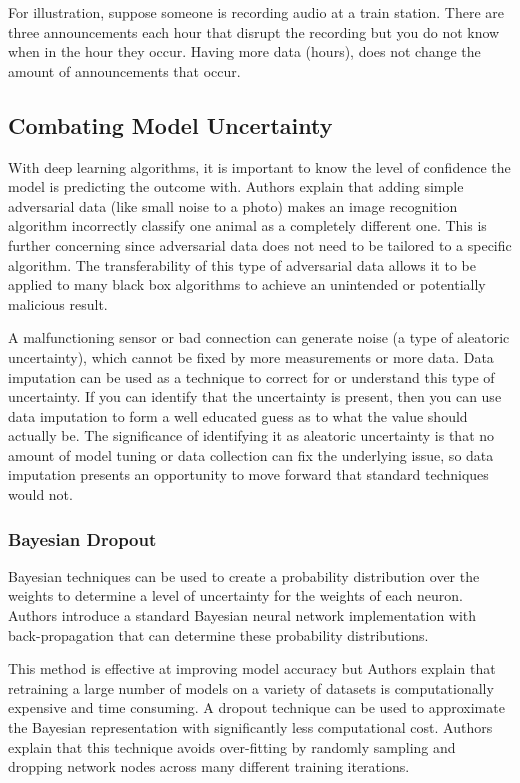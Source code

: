 For illustration, suppose someone is recording audio at a train station. There are three announcements each hour that disrupt the recording but you do not know when in the hour they occur. Having more data (hours), does not change the amount of announcements that occur.

\subsection{Combating Model Uncertainty}

With deep learning algorithms, it is important to know the level of confidence the model is predicting the outcome with. Authors \cite{explaining-adversarial-examples} explain that adding simple adversarial data (like small noise to a photo) makes an image recognition algorithm incorrectly classify one animal as a completely different one. This is further concerning since adversarial data does not need to be tailored to a specific algorithm. The transferability of this type of adversarial data allows it to be applied to many black box algorithms to achieve an unintended or potentially malicious result.

A malfunctioning sensor or bad connection can generate noise (a type of aleatoric uncertainty), which cannot be fixed by more measurements or more data. Data imputation can be used as a technique to correct for or understand this type of uncertainty. If you can identify that the uncertainty is present, then you can use data imputation to form a well educated guess as to what the value should actually be. The significance of identifying it as aleatoric uncertainty is that no amount of model tuning or data collection can fix the underlying issue, so data imputation presents an opportunity to move forward that standard techniques would not.

\subsubsection{Bayesian Dropout}

Bayesian techniques can be used to create a probability distribution over the weights to determine a level of uncertainty for the weights of each neuron. Authors \cite{bayesian-weight-uncertainty-neural-networks} introduce a standard Bayesian neural network implementation with back-propagation that can determine these probability distributions.

This method is effective at improving model accuracy but Authors \cite{gal2016dropout} explain that retraining a large number of models on a variety of datasets is computationally expensive and time consuming. A dropout technique can be used to approximate the Bayesian representation with significantly less computational cost. Authors \cite{gal2016dropout} explain that this technique avoids over-fitting by randomly sampling and dropping network nodes across many different training iterations.

